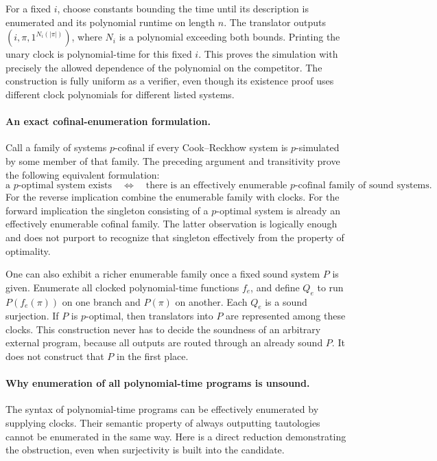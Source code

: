 \documentclass[11pt]{article}
\begin{document}
For a fixed $i$, choose constants bounding the time until its description
is enumerated and its polynomial runtime on length $n$. The translator
outputs $(i,\pi,1^{N_i(|\pi|)})$, where $N_i$ is a polynomial exceeding
both bounds. Printing the unary clock is polynomial-time for this fixed
$i$. This proves the simulation with precisely the allowed dependence
of the polynomial on the competitor. The construction is fully uniform
as a verifier, even though its existence proof uses different clock
polynomials for different listed systems.

\paragraph{An exact cofinal-enumeration formulation.}
Call a family of systems $p$-cofinal if every Cook--Reckhow system is
$p$-simulated by some member of that family. The preceding argument and
transitivity prove the following equivalent formulation:
\[
 \text{a $p$-optimal system exists}
 \quad\Longleftrightarrow\quad
 \text{there is an effectively enumerable $p$-cofinal family of sound systems}.
 \tag{355.1}
\]
For the reverse implication combine the enumerable family with clocks.
For the forward implication the singleton consisting of a $p$-optimal
system is already an effectively enumerable cofinal family. The latter
observation is logically enough and does not purport to recognize that
singleton effectively from the property of optimality.

One can also exhibit a richer enumerable family once a fixed sound
system $P$ is given. Enumerate all clocked polynomial-time functions
$f_e$, and define $Q_e$ to run $P(f_e(\pi))$ on one branch and $P(\pi)$
on another. Each $Q_e$ is a sound surjection. If $P$ is $p$-optimal,
then translators into $P$ are represented among these clocks. This
construction never has to decide the soundness of an arbitrary external
program, because all outputs are routed through an already sound $P$.
It does not construct that $P$ in the first place.

\paragraph{Why enumeration of all polynomial-time programs is unsound.}
The syntax of polynomial-time programs can be effectively enumerated
by supplying clocks. Their semantic property of always outputting
tautologies cannot be enumerated in the same way. Here is a direct
reduction demonstrating the obstruction, even when surjectivity is
built into the candidate.
\end{document}

